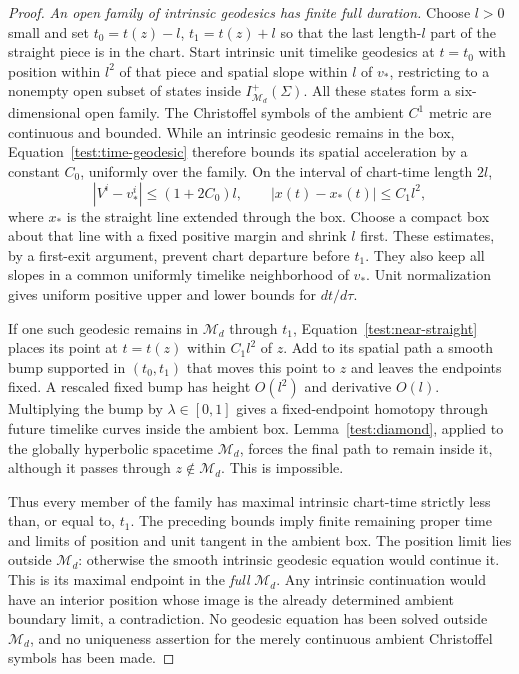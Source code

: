 \begin{proof}
\emph{An open family of intrinsic geodesics has finite full duration.}
Choose $l>0$ small and set $t_0=t(z)-l$, $t_1=t(z)+l$ so that
the last length-$l$ part of the straight piece is in the chart.
Start intrinsic unit timelike geodesics at $t=t_0$ with position
within $l^2$ of that piece and spatial slope within $l$ of $v_*$,
restricting to a nonempty open subset of states inside
$I^+_{\mathcal M_d}(\Sigma)$. All these states form a
six-dimensional open family. The Christoffel symbols of the ambient
$C^1$ metric are continuous and bounded. While an intrinsic geodesic
remains in the box, Equation~\eqref{test:time-geodesic} therefore
bounds its spatial acceleration by a constant $C_0$, uniformly over
the family. On the interval of chart-time length $2l$,
\begin{equation}\label{test:near-straight}
 |V^i-v_*^i|\le (1+2C_0)l,
 \qquad
 |x(t)-x_*(t)|\le C_1l^2,
\end{equation}
where $x_*$ is the straight line extended through the box. Choose a
compact box about that line with a fixed positive margin and shrink
$l$ first. These estimates, by a first-exit argument, prevent chart
departure before $t_1$. They also keep all slopes in a common
uniformly timelike neighborhood of $v_*$. Unit normalization gives
uniform positive upper and lower bounds for $dt/d\tau$.

If one such geodesic remains in $\mathcal M_d$ through $t_1$,
Equation~\eqref{test:near-straight} places its point at $t=t(z)$
within $C_1l^2$ of $z$. Add to its spatial path a smooth bump
supported in $(t_0,t_1)$ that moves this point to $z$ and leaves the
endpoints fixed. A rescaled fixed bump has height $O(l^2)$ and
derivative $O(l)$. Multiplying the bump by
$\lambda\in[0,1]$ gives a fixed-endpoint homotopy through future
timelike curves inside the ambient box. Lemma~\ref{test:diamond},
applied to the globally hyperbolic spacetime $\mathcal M_d$,
forces the final path to remain inside it, although it passes through
$z\notin\mathcal M_d$. This is impossible.

Thus every member of the family has maximal intrinsic chart-time
strictly less than, or equal to, $t_1$. The preceding bounds imply
finite remaining proper time and limits of position and unit tangent
in the ambient box. The position limit lies outside $\mathcal M_d$:
otherwise the smooth intrinsic geodesic equation would continue it.
This is its maximal endpoint in the \emph{full} $\mathcal M_d$.
Any intrinsic continuation would have an interior position whose
image is the already determined ambient boundary limit, a
contradiction. No geodesic equation has been solved outside
$\mathcal M_d$, and no uniqueness assertion for the merely
continuous ambient Christoffel symbols has been made.


\end{proof}
